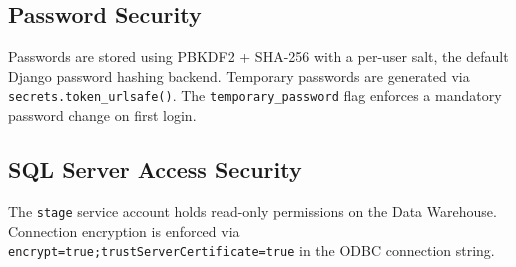 \begin{sloppypar}
\subsection{Password Security}

Passwords are stored using PBKDF2 + SHA-256 with a per-user salt, the default
Django password hashing backend. Temporary passwords are generated via
\texttt{secrets.token\_urlsafe()}. The \texttt{temporary\_password} flag
enforces a mandatory password change on first login.

\subsection{SQL Server Access Security}

The \texttt{stage} service account holds read-only permissions on the Data
Warehouse. Connection encryption is enforced via
\texttt{encrypt=true;trustServerCertificate=true} in the ODBC connection
string.

\end{sloppypar}

